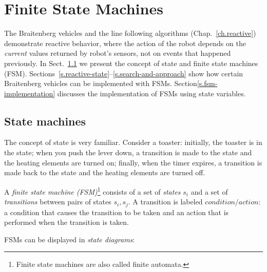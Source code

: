 
\chapter{Finite State Machines}\label{ch.fmg}


The Braitenberg vehicles and the line following algorithms (Chap.~\ref{ch.reactive}) demonstrate reactive behavior, where the action of the robot depends on the \emph{current} values returned by robot's sensors, not on events that happened previously. In Sect.~\ref{s.sm} we present the concept of state and finite state machines (FSM). Sections~\ref{s.reactive-state}--\ref{s.search-and-approach} show how certain Braitenberg vehicles can be implemented with FSMs. Section\ref{s.fsm-implementation} discusses the implementation of FSMs using state variables.

\section{State machines}\label{s.sm}

The concept of state is very familiar. Consider a toaster: initially, the toaster is in the  state; when you push the lever down, a transition is made to the  state and the heating elements are turned on; finally, when the timer expires, a transition is made back to the  state and the heating elements are turned off.

A \emph{finite state machine (FSM)}\footnote{Finite state machines are also called finite automata.}  consists of a set of \emph{states} $s_i$ and a set of \emph{transitions} between pairs of states $s_i, s_j$. A transition is labeled $\mathit{condition} / \mathit{action}$: a condition that causes the transition to be taken and an action that is performed when the transition is taken.

FSMs can be displayed in \emph{state diagrams}:
\begin{center}
\end{center}

